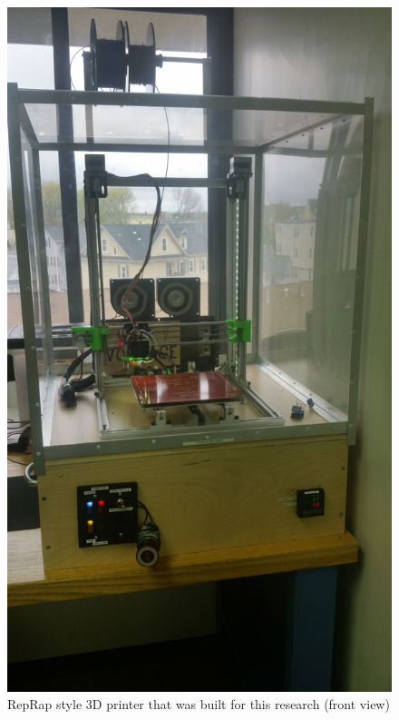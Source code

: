 \begin{figure}[t]
  \centering
  \includegraphics[width=\linewidth, angle=-90]{images/print1.jpg}
  \caption{RepRap style 3D printer that was built for this research (front view)}
  \label{fig:print1}
\end{figure}

